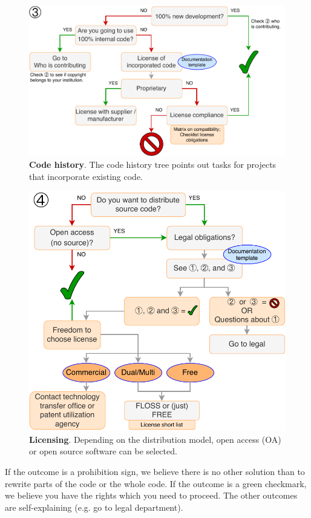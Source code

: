 \documentclass[a4paper,num-refs,numbers,sort&compress]{de-rse}
\begin{document}
\begin{figure}[h!]
  \centering
  \includegraphics[scale=0.5]{tree_new_SW_development}
  \caption{\textbf{Code history}. The code history tree points out tasks for projects that incorporate existing code.}
  \label{fig:tree2}
\end{figure}

\begin{figure}[h!]
  \centering
  \includegraphics[scale=0.5]{tree_licensing}
  \caption{\textbf{Licensing}. Depending on the distribution model, open access (OA) or open source software can be selected.}
  \label{fig:tree3}
\end{figure}

If the outcome is a prohibition sign, we believe there is no other solution than to rewrite parts of the code or the whole code. If the outcome is a green checkmark, we believe you have the rights which you need to proceed. The other outcomes are self-explaining (e.g. go to legal department).
\end{document}
